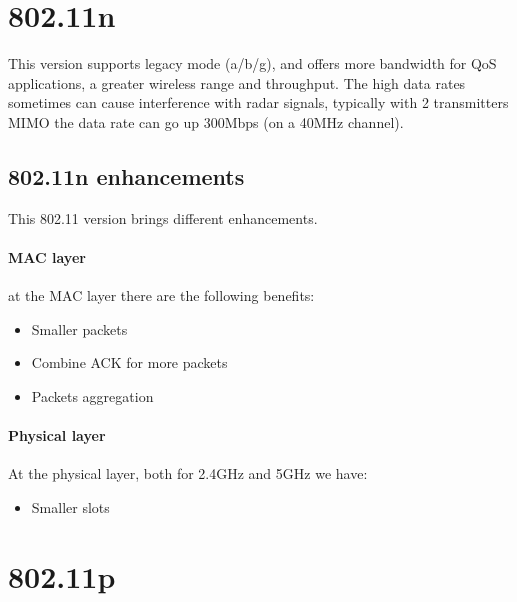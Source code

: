 \section{802.11n}

This version supports legacy mode (a/b/g), and offers more bandwidth for QoS
applications, a greater wireless range and throughput.
The high data rates sometimes can cause interference with radar signals,
typically with 2 transmitters MIMO the data rate can go up 300Mbps (on a 40MHz
channel).

\subsection{802.11n enhancements}

This 802.11 version brings different enhancements.

\paragraph*{MAC layer} at the MAC layer there are the following benefits:
\begin{itemize}
\item Smaller packets
\item Combine ACK for more packets
\item Packets aggregation
\end{itemize}

\paragraph*{Physical layer} At the physical layer, both for 2.4GHz and 5GHz we
have:
\begin{itemize}
\item Smaller slots
\end{itemize}

\section{802.11p}
